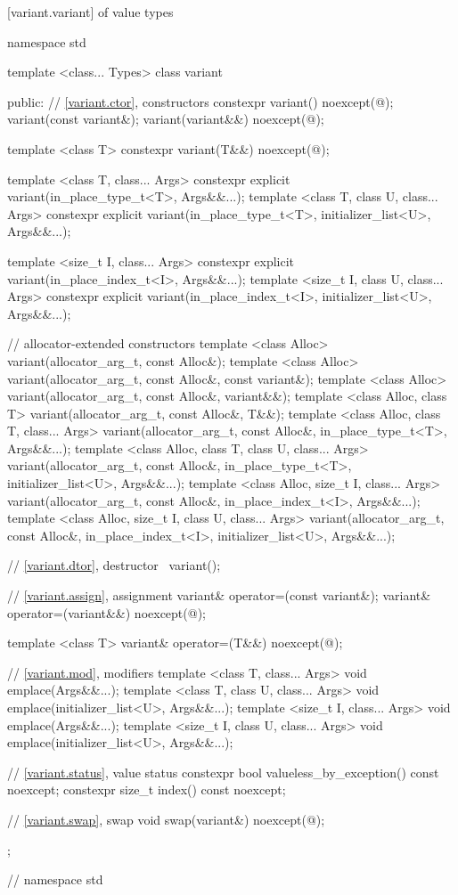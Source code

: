 %
[variant.variant]{ of value types}

\begin{codeblock}
namespace std {
  template <class... Types>
  class variant {
  public:
    // \ref{variant.ctor}, constructors
    constexpr variant() noexcept(@\seebelow@);
    variant(const variant&);
    variant(variant&&) noexcept(@\seebelow@);

    template <class T> constexpr variant(T&&) noexcept(@\seebelow@);

    template <class T, class... Args>
      constexpr explicit variant(in_place_type_t<T>, Args&&...);
    template <class T, class U, class... Args>
      constexpr explicit variant(in_place_type_t<T>, initializer_list<U>, Args&&...);

    template <size_t I, class... Args>
      constexpr explicit variant(in_place_index_t<I>, Args&&...);
    template <size_t I, class U, class... Args>
      constexpr explicit variant(in_place_index_t<I>, initializer_list<U>, Args&&...);

    // allocator-extended constructors
    template <class Alloc>
      variant(allocator_arg_t, const Alloc&);
    template <class Alloc>
      variant(allocator_arg_t, const Alloc&, const variant&);
    template <class Alloc>
      variant(allocator_arg_t, const Alloc&, variant&&);
    template <class Alloc, class T>
      variant(allocator_arg_t, const Alloc&, T&&);
    template <class Alloc, class T, class... Args>
      variant(allocator_arg_t, const Alloc&, in_place_type_t<T>, Args&&...);
    template <class Alloc, class T, class U, class... Args>
      variant(allocator_arg_t, const Alloc&, in_place_type_t<T>, initializer_list<U>, Args&&...);
    template <class Alloc, size_t I, class... Args>
      variant(allocator_arg_t, const Alloc&, in_place_index_t<I>, Args&&...);
    template <class Alloc, size_t I, class U, class... Args>
      variant(allocator_arg_t, const Alloc&, in_place_index_t<I>, initializer_list<U>, Args&&...);

    // \ref{variant.dtor}, destructor
    ~variant();

    // \ref{variant.assign}, assignment
    variant& operator=(const variant&);
    variant& operator=(variant&&) noexcept(@\seebelow@);

    template <class T> variant& operator=(T&&) noexcept(@\seebelow@);

    // \ref{variant.mod}, modifiers
    template <class T, class... Args> void emplace(Args&&...);
    template <class T, class U, class... Args>
      void emplace(initializer_list<U>, Args&&...);
    template <size_t I, class... Args> void emplace(Args&&...);
    template <size_t I, class U, class... Args>
      void emplace(initializer_list<U>, Args&&...);

    // \ref{variant.status}, value status
    constexpr bool valueless_by_exception() const noexcept;
    constexpr size_t index() const noexcept;

    // \ref{variant.swap}, swap
    void swap(variant&) noexcept(@\seebelow@);
  };
} // namespace std
\end{codeblock}

